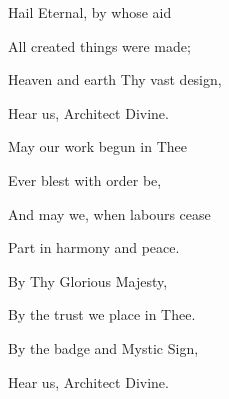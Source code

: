 \noindent
\begin{minipage}[t]{0.30\textwidth}
\small
Hail Eternal, by whose aid\par
All created things were made;\par
Heaven and earth Thy vast design,\par
Hear us, Architect Divine.
\end{minipage}\hspace{0.05\textwidth}%
\begin{minipage}[t]{0.30\textwidth}
\small
May our work begun in Thee\par
Ever blest with order be,\par
And may we, when labours cease\par
Part in harmony and peace.
\end{minipage}\hspace{0.05\textwidth}%
\begin{minipage}[t]{0.30\textwidth}
\small
By Thy Glorious Majesty,\par
By the trust we place in Thee.\par
By the badge and Mystic Sign,\par
Hear us, Architect Divine.
\end{minipage}
